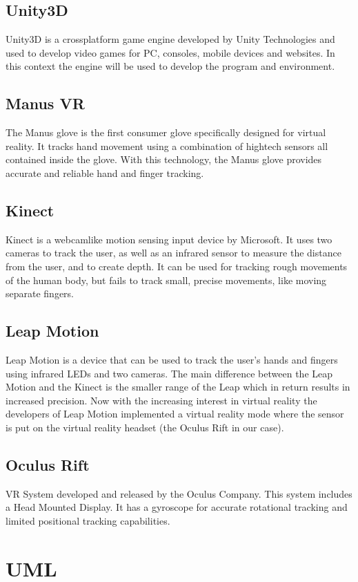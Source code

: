 \documentclass[11pt,a4paper]{report}
\begin{document}
\section*{Unity3D}
Unity3D is a cross­platform game engine developed by Unity Technologies and used to
develop video games for PC, consoles, mobile devices and websites. In this context the engine
will be used to develop the program and environment.
\section*{Manus VR}
The Manus glove is the first consumer glove specifically designed for virtual reality. It tracks
hand movement using a combination of high­tech sensors all contained inside the glove. With
this technology, the Manus glove provides accurate and reliable hand­ and finger tracking.
\section*{Kinect}
Kinect is a webcam­like motion sensing input device by Microsoft. It uses two cameras to
track the user, as well as an infrared sensor to measure the distance from the user, and to
create depth. It can be used for tracking rough movements of the human body, but fails to
track small, precise movements, like moving separate fingers.
\section*{Leap Motion}
Leap Motion is a device that can be used to track the user’s hands and fingers using infrared
LEDs and two cameras. The main difference between the Leap Motion and the Kinect is the
smaller range of the Leap which in return results in increased precision. Now with the
increasing interest in virtual reality the developers of Leap Motion implemented a virtual
reality mode where the sensor is put on the virtual reality headset (the Oculus Rift in our
case).
\section*{Oculus Rift}
VR System developed and released by the Oculus Company. This system includes a Head
Mounted Display. It has a gyroscope for accurate rotational tracking and limited positional
tracking capabilities.


\chapter{UML}
\end{document}
